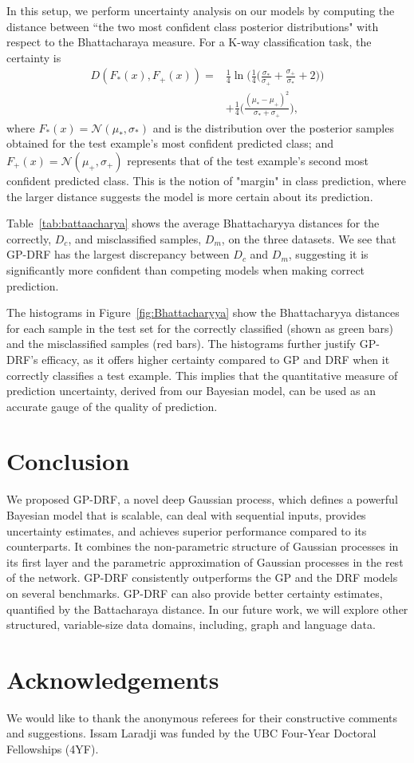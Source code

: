 \documentclass[conference]{IEEEtran}
\begin{document}
In this setup, we perform uncertainty analysis on our models by computing the distance between ``the two most confident class posterior distributions" with respect to the Bhattacharaya measure. For a K-way classification task, the certainty is
\begin{equation}
\begin{split}
    D(F_*(x), F_+(x)) = &\frac{1}{4}\ln{\Big(\frac{1}{4}\Big(\frac{\sigma_*}{\sigma_+}
                        +\frac{\sigma_+}{\sigma_*}+2}\Big)\Big) \\&+ \frac{1}{4}\Big(\frac{(\mu_*-\mu_+)^2}{\sigma_*+\sigma_+}\Big),
\end{split}
\end{equation}
where $F_*(x) = \mathcal{N}(\mu_*, \sigma_*)$ and is the distribution over the posterior samples obtained for the test example's most confident predicted class; and $F_+(x) = \mathcal{N}(\mu_+, \sigma_+)$ represents that of the test example's second most confident predicted class. This is the notion of "margin" in class prediction, where the larger distance suggests the model is more certain about its prediction.

Table~\ref{tab:battaacharya} shows the average Bhattacharyya distances for the correctly, $D_c$, and misclassified samples, $D_m$, on the three datasets. We see that GP-DRF has the largest discrepancy between $D_c$ and  $D_m$, suggesting it is significantly more confident than competing models when making correct prediction. 

The histograms in Figure~\ref{fig:Bhattacharyya} show the Bhattacharyya distances for each sample in the test set for the correctly classified (shown as green bars) and the misclassified samples (red bars). The histograms further justify GP-DRF's efficacy, as it offers higher certainty compared to GP and DRF when it correctly classifies a test example. This implies that the quantitative measure of prediction uncertainty, derived from our Bayesian model, can be used as an accurate gauge of the quality of prediction. 




\section{Conclusion}
We proposed GP-DRF, a novel deep Gaussian process, which defines a powerful Bayesian model that is scalable, can deal with sequential inputs, provides uncertainty estimates, and achieves superior performance compared to its counterparts. It combines the non-parametric structure of Gaussian processes in its first layer and the parametric approximation of Gaussian processes in the rest of the network. GP-DRF consistently outperforms the GP and the DRF models on several benchmarks. GP-DRF can also provide better certainty estimates, quantified by the Battacharaya distance. In our future work, we will explore other structured, variable-size data domains, including, graph and language data.


\section{Acknowledgements}
We would like to thank the anonymous referees for their constructive comments and suggestions. Issam Laradji was funded by the UBC Four-Year Doctoral Fellowships (4YF).




\end{document}
